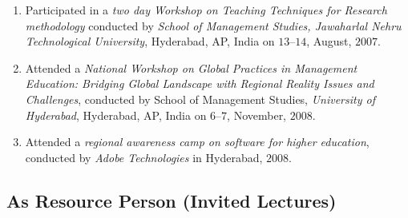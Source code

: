 \documentclass[10pt]{article}
\begin{document}
\begin{enumerate}
\item Participated in a \textit{two day Workshop on Teaching Techniques for Research methodology} conducted by  \textit{School of Management Studies, Jawaharlal Nehru Technological University}, Hyderabad, AP, India on  $13 – 14$, August, $2007$.

\item Attended a \textit{National Workshop on Global Practices in Management Education: Bridging Global Landscape with Regional Reality Issues and Challenges}, conducted by School of Management Studies, \textit{University of Hyderabad}, Hyderabad, AP, India on $6 – 7$, November, $2008$.

\item Attended a \textit{regional awareness camp on software for higher education}, conducted by \textit{Adobe Technologies} in Hyderabad, $2008$. 

\end{enumerate}

\subsection{As Resource Person (Invited Lectures)}
\end{document}
